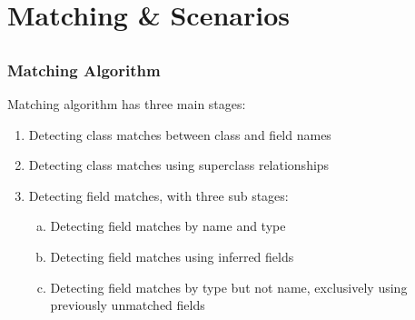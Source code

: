 \documentclass{beamer}
\begin{document}
\section{Matching \& Scenarios}
\subsection{}

\begin{frame}
  \frametitle{Matching Algorithm}
  Matching algorithm has three main stages:
  \begin{enumerate}[1)]
    \item Detecting class matches between class and field names
    \item Detecting class matches using superclass relationships
    \item Detecting field matches, with three sub stages:
    \begin{enumerate}[a)]
      \item Detecting field matches by name and type
      \item Detecting field matches using inferred fields
      \item Detecting field matches by type but not name, exclusively using previously unmatched fields
    \end{enumerate}
  \end{enumerate}
\end{frame}
\end{document}
